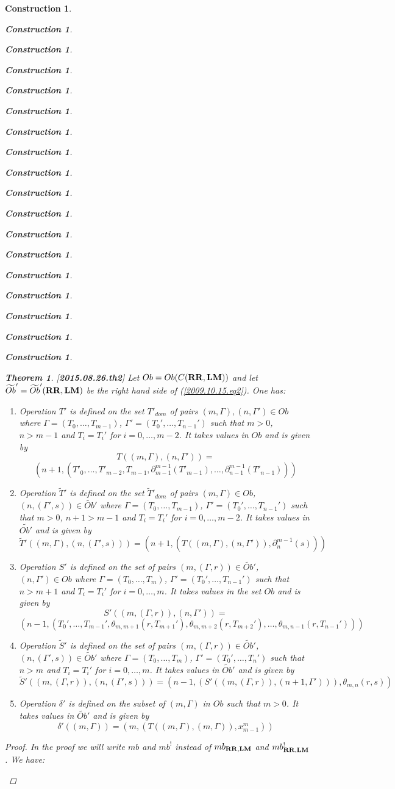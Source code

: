 \documentclass[12pt]{amsart}
\newtheorem{theorem}[proposition]{Theorem}
\newtheorem{construction}[proposition]{Construction}
\newcommand{\llabel}[1]{\label{#1}[{\bf #1}]}
\newcommand{\wt}{\widetilde}
\newcommand{\RR}{{\bf RR}}
\newcommand{\LM}{{\bf LM}}
\begin{document}
\begin{construction}
\begin{construction}
\begin{construction}
\begin{construction}
\begin{construction}
\begin{construction}
\begin{construction}
\begin{construction}
\begin{construction}
\begin{construction}
\begin{construction}
\begin{construction}
\begin{construction}
\begin{construction}
\begin{construction}
\begin{construction}
\begin{construction}
\begin{construction}
  
%
\begin{theorem}\llabel{2015.08.26.th2}
Let $Ob=Ob(C(\RR,\LM))$ and let $\wt{Ob}'=\wt{Ob}'(\RR,\LM)$ be the right hand side of (\ref{2009.10.15.eq2}). One has:
%
\begin{enumerate}
\item Operation $T'$ is defined on the set $T'_{dom}$ of pairs $(m,\Gamma),(n,\Gamma')\in Ob$ where $\Gamma=(T_0,\dots,T_{m-1})$, $\Gamma'=(T_0',\dots,T_{n-1}')$ such that $m>0$, $n>m-1$ and $T_i=T_i'$ for $i=0,\dots,m-2$. It takes values in $Ob$ and is given by 
%
$$T((m,\Gamma),(n,\Gamma'))=$$$$(n+1,(T'_0,\dots,T'_{m-2},T_{m-1},\partial_{m-1}^{m-1}(T'_{m-1}),\dots,\partial_{n-1}^{m-1}(T'_{n-1})))$$
%
\item Operation $\wt{T}'$ is defined on the set $\wt{T}'_{dom}$ of pairs $(m,\Gamma)\in Ob$, $(n,(\Gamma',s))\in\wt{Ob}'$ where $\Gamma=(T_0,\dots,T_{m-1})$, $\Gamma'=(T_0',\dots,T_{n-1}')$ such that $m>0$, $n+1>m-1$ and $T_i=T_i'$ for $i=0,\dots,m-2$. It takes values in $\wt{Ob'}$ and is given by
%
$$\wt{T}'((m,\Gamma),(n,(\Gamma',s)))=(n+1,(T((m,\Gamma),(n,\Gamma')),\partial_{n}^{m-1}(s)))$$
%
\item Operation $S'$ is defined on the set of pairs $(m,(\Gamma,r))\in \wt{Ob}'$, $(n,\Gamma')\in Ob$ where $\Gamma=(T_0,\dots,T_{m})$, $\Gamma'=(T_0',\dots,T_{n-1}')$ such that $n>m+1$ and $T_i=T_i'$ for $i=0,\dots,m$. It takes values in the set $Ob$ and is given by 
%
$$S'((m,(\Gamma,r)),(n,\Gamma'))=$$$$(n-1,(T_0',\dots,T_{m-1}',\theta_{m,m+1}(r,T_{m+1}'),\theta_{m,m+2}(r,T_{m+2}'),\dots,\theta_{m,n-1}(r,T_{n-1}')))$$
%
\item Operation $\wt{S}'$ is defined on the set of pairs $(m,(\Gamma,r))\in \wt{Ob}'$, $(n,(\Gamma',s))\in \wt{Ob}'$ where $\Gamma=(T_0,\dots,T_{m})$, $\Gamma'=(T_0',\dots,T_{n}')$ such that $n>m$ and $T_i=T_i'$ for $i=0,\dots,m$. It takes values in $\wt{Ob}'$ and is given by 
%
$$\wt{S}'((m,(\Gamma,r)),(n,(\Gamma',s)))=(n-1,(S'((m,(\Gamma,r)),(n+1,\Gamma'))),\theta_{m,n}(r,s))$$
%
\item Operation $\delta'$ is defined on the subset of $(m,\Gamma)$ in $Ob$ such that $m>0$. It takes values in $\wt{Ob}'$ and is given by 
%
$$\delta'((m,\Gamma))=(m,(T((m,\Gamma),(m,\Gamma)),x_{m-1}^m))$$
%
\end{enumerate}
\end{theorem}
%
\begin{proof}
In the proof we will write $mb$ and $mb^!$ instead of $mb_{\RR,\LM}$ and $mb^!_{\RR,\LM}$. We have:
%
\begin{enumerate}

\end{enumerate}
\end{proof}
\end{construction}
\end{construction}
\end{construction}
\end{construction}
\end{construction}
\end{construction}
\end{construction}
\end{construction}
\end{construction}
\end{construction}
\end{construction}
\end{construction}
\end{construction}
\end{construction}
\end{construction}
\end{construction}
\end{construction}
\end{construction}
\end{document}
